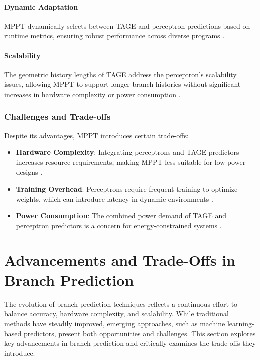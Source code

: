 \documentclass[10pt,journal,compsoc]{IEEEtran}
\begin{document}
\paragraph*{Dynamic Adaptation} 
MPPT dynamically selects between TAGE and perceptron predictions based on runtime metrics, ensuring robust performance across diverse programs \cite{penneySurveyMachineLearning2019a}.

\paragraph*{Scalability} 
The geometric history lengths of TAGE address the perceptron's scalability issues, allowing MPPT to support longer branch histories without significant increases in hardware complexity or power consumption \cite{josephSurveyDeepLearning2021a}.

\subsubsection*{Challenges and Trade-offs}

Despite its advantages, MPPT introduces certain trade-offs:
\begin{itemize}
    \item \textbf{Hardware Complexity}: Integrating perceptrons and TAGE predictors increases resource requirements, making MPPT less suitable for low-power designs \cite{1003559}.
    \item \textbf{Training Overhead}: Perceptrons require frequent training to optimize weights, which can introduce latency in dynamic environments \cite{SurveyTechniquesDynamica}.
    \item \textbf{Power Consumption}: The combined power demand of TAGE and perceptron predictors is a concern for energy-constrained systems \cite{penneySurveyMachineLearning2019a}.
\end{itemize}
\section{Advancements and Trade-Offs in Branch Prediction}\label{Comparisions}

The evolution of branch prediction techniques reflects a continuous effort to balance accuracy, hardware complexity, and scalability. While traditional methods have steadily improved, emerging approaches, such as machine learning-based predictors, present both opportunities and challenges. This section explores key advancements in branch prediction and critically examines the trade-offs they introduce.
\end{document}
